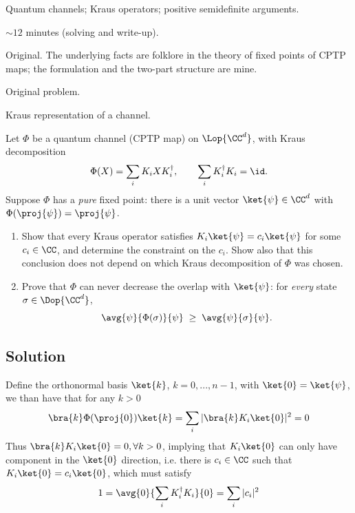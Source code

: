 
\begin{daymeta}
  \item[Topic] Quantum channels; Kraus operators; positive semidefinite arguments.
  \item[Estimated time] $\sim 12$ minutes (solving and write-up).
  \item[Origin] Original. The underlying facts are folklore in the theory of fixed
    points of CPTP maps; the formulation and the two-part structure are mine.
  \item[Source] Original problem.
  \item[Prerequisites] Kraus representation of a channel.
\end{daymeta}

\begin{problem}
Let $\Phi$ be a quantum channel (CPTP map) on $\Lop{\CC^{d}}$, with Kraus decomposition
\[
  \Phi(X)=\sum_{i} K_i X K_i^{\dagger},
  \qquad
  \sum_i K_i^{\dagger} K_i = \id .
\]
Suppose $\Phi$ has a \emph{pure} fixed point: there is a unit vector
$\ket{\psi}\in\CC^{d}$ with $\Phi(\proj{\psi})=\proj{\psi}$.
\begin{enumerate}[label=\textbf{(\alph*)},leftmargin=*]
  \item Show that every Kraus operator satisfies $K_i\ket{\psi}=c_i\ket{\psi}$ for some
        $c_i\in\CC$, and determine the constraint on the $c_i$. Show also that this
        conclusion does not depend on which Kraus decomposition of $\Phi$ was chosen.
  \item Prove that $\Phi$ can never decrease the overlap with $\ket{\psi}$: for
        \emph{every} state $\sigma\in\Dop{\CC^{d}}$,
        \[
          \avg{\psi}{\Phi(\sigma)}{\psi} \;\ge\; \avg{\psi}{\sigma}{\psi} .
        \]
\end{enumerate}
\end{problem}

\subsection*{Solution}

\begin{solution}[Part (a)]
Define the orthonormal basis $\ket{k}$, $k=0,...,n-1$, with $\ket{0}=\ket{\psi}$, we than have that for any $k>0$ 
\begin{equation}
    \bra{k}\Phi(\proj{0})\ket{k} = \sum_i |\bra{k}K_i\ket{0}|^2 =0
\end{equation}
Thus $\bra{k}K_i\ket{0}=0, \forall k>0$, implying that $K_i\ket{0}$ can only have component in the $\ket{0}$ direction, i.e. there is $c_i \in \CC$ such that $K_i\ket{0}=c_i\ket{0}$, which must satisfy
\begin{equation}
    1 = \avg{0}{\sum_i K_i^{\dagger} K_i}{0} = \sum_i |c_i|^2
\end{equation}

\end{solution}

